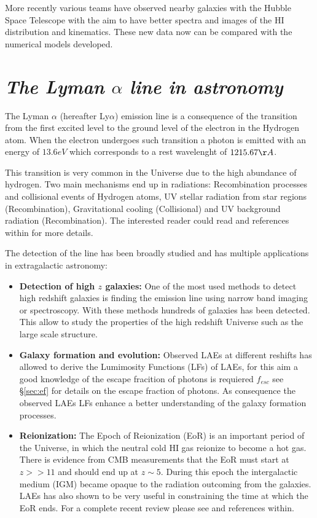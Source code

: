 More recently various teams \citep{Mas-Hesse09,LARS} have
observed nearby galaxies with the Hubble Space Telescope with the
aim to have better spectra and images of the HI distribution 
and kinematics. These new data now can be compared with the numerical 
models developed.

 

\section{\emph{The Lyman $\alpha$ line in astronomy}}\label{sec:lyuses}

The Lyman $\alpha$ (hereafter Ly$\alpha$) emission line is a consequence of the 
transition 
from the first excited level to the ground level of the electron
in the Hydrogen atom. When the electron undergoes such transition 
a photon is emitted with an energy of $13.6eV$ which corresponds to 
a rest wavelenght of $1215.67 \AA$. 

This transition is very common in the Universe due to the high abundance
of hydrogen. Two main mechanisms end up in \ly radiations: Recombination 
processes and collisional events of Hydrogen atoms, UV stellar radiation
from star regions (Recombination), Gravitational 
cooling (Collisional) and UV background radiation (Recombination). The interested
reader could read \citep{LaursenPhD} and references within for
more details. 

The detection of the \ly line has been broadly studied and has multiple 
applications in extragalactic astronomy:

\begin{itemize}
\item {\bf{Detection of high $z$ galaxies:}} One of the most used 
methods to detect high redshift galaxies is finding the \ly emission 
line using narrow band imaging or spectroscopy. With these methods 
hundreds of galaxies has been detected. This 
allow to study the properties of the high redshift Universe such as
the large scale structure. 
 
\item {\bf{Galaxy formation and evolution:}} Observed LAEs at different
reshifts has allowed to derive the Lumimosity Functions (LFs) of LAEs, 
for this aim a good knowledge of the escape fracition of 
photons is requiered $f_{esc}$ see \S \ref{sec:ef} for details on the escape 
fraction of \ly photons. As consequence the observed LAEs LFs enhance a
better understanding of the galaxy formation processes. 

\item {\bf{Reionization:}} The Epoch of Reionization (EoR) is an important
period of the Universe, in which the neutral cold HI gas reionize to 
become a hot gas. There is evidence from CMB measurements that 
the EoR must start at $z >> 11$ and should end up at $z\sim5$. During this 
epoch the intergalactic medium (IGM) became opaque to the \ly radiation 
outcoming from the galaxies. LAEs has also shown to be 
very useful in constraining the time at which the EoR ends. 
For a complete recent review please see \citep{review} and references
within.
 
\end{itemize}


